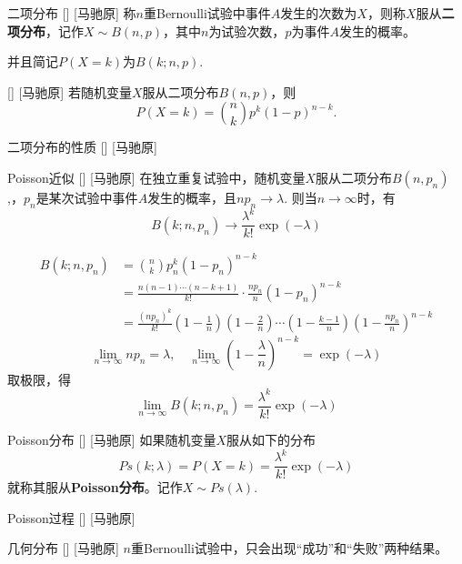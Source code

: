 \documentclass[UTF8]{ctexart}
\begin{document}
        \begin{dfn}
            []
            {二项分布}
            []
            [马驰原]
            称$n$重Bernoulli试验中事件$A$发生的次数为$X$，则称$X$服从\textbf{二项分布}，记作$X\sim B(n,p)$，其中$n$为试验次数，$p$为事件$A$发生的概率。

            并且简记$P(X=k)$为$B(k;n,p)$.
        \end{dfn}

        \begin{thm}
            []
            {}
            []
            [马驰原]
            若随机变量$X$服从二项分布$B(n,p)$，则\[P(X=k)=\binom{n}{k}p^k(1-p)^{n-k}.\]
        \end{thm}

        \begin{ppt}
            []
            {二项分布的性质}
            []
            [马驰原]
        \end{ppt}

        \begin{thm}
            []
            {Poisson近似}
            []
            [马驰原]
            在独立重复试验中，随机变量$X$服从二项分布$B(n,p_n)$,，$p_n$是某次试验中事件$A$发生的概率，且$np_n\to\lambda $. 则当$n\to\infty$时，有\[B(k;n,p_n)\to\frac{\lambda^k}{k!}\exp (-\lambda) \]
        \end{thm}

        \begin{prf}
            \[
                \begin{aligned}
                    B(k;n,p_n) &= \binom{n}{k}p_n^k(1-p_n)^{n-k}\\
                    &=\frac{n(n-1)\cdots(n-k+1)}{k!}\cdot\frac{np_n}{n}\left(1-p_n \right)^{n-k}\\
                    &=\frac{(np_n)^k}{k!}\left(1-\frac{1}{n} \right)\left(1-\frac{2}{n} \right)\cdots\left(1-\frac{k-1}{n} \right)\left(1-\frac{np_n}{n} \right)^{n-k}        
                \end{aligned}
            \]
            \[\lim_{n\to\infty}np_n=\lambda,\quad\lim_{n\to\infty}\left(1-\frac{\lambda}{n} \right)^{n-k}=\exp(-\lambda) \]
            取极限，得\[\lim_{n\to\infty} B(k;n,p_n)=\frac{\lambda^k}{k!}\exp (-\lambda) \]
        \end{prf}

        \begin{dfn}
            []
            {Poisson分布}
            []
            [马驰原]
            如果随机变量$X$服从如下的分布\[Ps(k;\lambda)=P(X=k)=\frac{\lambda^k}{k!}\exp (-\lambda)\]就称其服从\textbf{Poisson分布}。记作$X\sim Ps(\lambda)$.
        \end{dfn}

        \begin{dfn}
            []
            {Poisson过程}
            []
            [马驰原]
        \end{dfn}

        \begin{dfn}
            []
            {几何分布}
            []
            [马驰原]
            $n$重Bernoulli试验中，只会出现“成功”和“失败”两种结果。
        \end{dfn}
\end{document}
